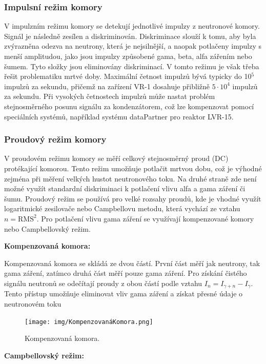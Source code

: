 \subsubsection*{Impulsní režim komory}

V impulzním režimu komory se detekují jednotlivé impulzy z neutronové komory. Signál je následně zesílen a diskriminován. Diskriminace slouží k tomu, aby byla zvýrazněna odezva na neutrony, která je nejsilnější, a naopak potlačeny impulzy s menší amplitudou, jako jsou impulzy způsobené gama, beta, alfa zářením nebo šumem. Tyto složky jsou eliminovány diskriminací. V tomto režimu je však třeba řešit problematiku mrtvé doby. Maximální četnost impulzů bývá typicky do 10$^5$ impulzů za sekundu, přičemž na zařízení VR-1 dosahuje přibližně $5 \cdot10^4$ impulzů za sekundu. Při vysokých četnostech impulzů může nastat problém stejnosměrného posunu signálu za kondenzátorem, což lze kompenzovat pomocí speciálních systémů, například systému dataPartner pro reaktor LVR-15.


\subsubsection*{Proudový režim komory}
V proudovém režimu komory se měří celkový stejnosměrný proud (DC) protékající komorou. Tento režim umožňuje potlačit mrtvou dobu, což je výhodné zejména při měření velkých hustot neutronového toku. Na druhé straně zde není možné využít standardní diskriminaci k potlačení vlivu alfa a gama záření či šumu. Proudový režim se používá pro velké rozsahy proudů, kde je vhodné využít logaritmické zesilovače nebo Campbellovu metodu, která vychází ze vztahu $n=\text{RMS}^2$. Pro potlačení vlivu gama záření se využívají kompenzované komory nebo Campbellovský režim.

\textbf{Kompenzovaná komora:}

Kompenzovaná komora se skládá ze dvou částí. První část měří jak neutrony, tak gama záření, zatímco druhá část měří pouze gama záření. Pro získání čistého signálu neutronů se odečítají proudy z obou částí podle vztahu $I_n=I_{\gamma+n}-I_{\gamma}$. Tento přístup umožňuje eliminovat vliv gama záření a získat přesné údaje o neutronovém toku

\begin{figure}[H] 
    \centering
    \texttt{[image: img/KompenzovanáKomora.png]}
    \caption{Kompenzovaná komora.}
    \label{fig:KompenzovanáKomora}
\end{figure}


\textbf{Campbellovský režim:}

